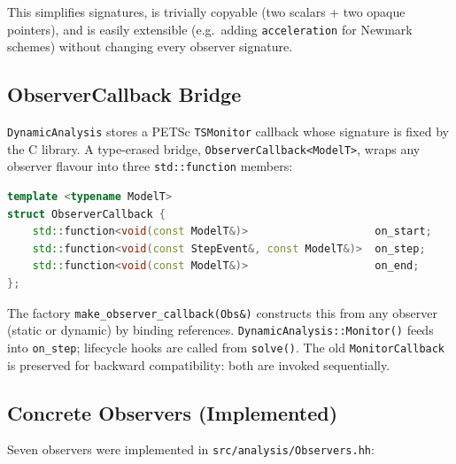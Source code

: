 This simplifies signatures, is trivially copyable (two scalars + two
opaque pointers), and is easily extensible (e.g.\ adding
\texttt{acceleration} for Newmark schemes) without changing every
observer signature.

\subsection{ObserverCallback Bridge}
\label{sec:impl-observer-callback}

\texttt{DynamicAnalysis} stores a PETSc \texttt{TSMonitor} callback
whose signature is fixed by the C library.  A type-erased bridge,
\texttt{ObserverCallback<ModelT>}, wraps any observer flavour into three
\texttt{std::function} members:

\begin{lstlisting}[language=C++,basicstyle=\ttfamily\small]
template <typename ModelT>
struct ObserverCallback {
    std::function<void(const ModelT&)>                    on_start;
    std::function<void(const StepEvent&, const ModelT&)>  on_step;
    std::function<void(const ModelT&)>                    on_end;
};
\end{lstlisting}

The factory \texttt{make\_observer\_callback(Obs\&)} constructs this
from any observer (static or dynamic) by binding references.
\texttt{DynamicAnalysis::Monitor()} feeds into \texttt{on\_step};
lifecycle hooks are called from \texttt{solve()}.  The old
\texttt{MonitorCallback} is preserved for backward compatibility:
both are invoked sequentially.

\subsection{Concrete Observers (Implemented)}
\label{sec:impl-concrete-observers}

Seven observers were implemented in
\texttt{src/analysis/Observers.hh}:

